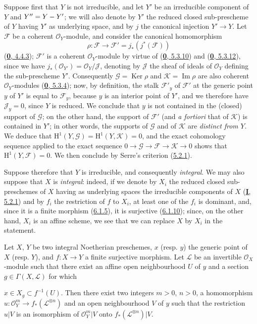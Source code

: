 Suppose first that $Y$ is not irreducible, and let $Y'$ be an irreducible
component of $Y$ and $Y''=Y- Y'$; we will also denote by
$Y'$ the reduced closed sub-prescheme of $Y$ having $Y'$ as underlying
space, and by $j$ the canonical injection $Y'\to Y$. Let $\mathcal{F}$
be a coherent $\mathcal{O}_Y$-module, and consider the canonical homomorphism
\[
\rho:\mathcal{F}\longrightarrow
\mathcal{F}'=j_*(j^*(\mathcal{F}))
\]
(\hyperref[0.4.4.3]{\textbf{0}, 4.4.3}); $\mathcal{F}'$ is a coherent
$\mathcal{O}_Y$-module by virtue of
(\hyperref[0.5.3.10]{\textbf{0}, 5.3.10}) and
(\hyperref[0.5.3.12]{\textbf{0}, 5.3.12}), since we have
$j_*(\mathcal{O}_{Y'})=\mathcal{O}_Y/\mathcal{J}$, denoting by
$\mathcal{J}$ the sheaf of ideals of $\mathcal{O}_Y$ defining the
sub-prescheme $Y'$. Consequently $\mathcal{G}=\operatorname{Ker}\rho$ and
$\mathcal{K}=\operatorname{Im}\rho$ are also coherent $\mathcal{O}_Y$-modules
(\hyperref[0.5.3.4]{\textbf{0}, 5.3.4}); now, by definition, the stalk
$\mathcal{F}'_y$ of $\mathcal{F}'$ at the generic point $y$ of $Y'$ is equal
to $\mathcal{F}_y$, because $y$ is an interior point of $Y'$, and we therefore
have $\mathcal{J}_y=0$, since $Y$ is reduced. We conclude that $y$ is not
contained in the (closed) support of $\mathcal{G}$; on the other hand, the
support of $\mathcal{F}'$ (and \emph{a fortiori} that of $\mathcal{K}$) is
contained in $Y'$; in other words, the supports of $\mathcal{G}$ and of
$\mathcal{K}$ are \emph{distinct from $Y$}. We deduce that
$\mathrm{H}^1(Y,\mathcal{G})=\mathrm{H}^1(Y,\mathcal{K})=0$, and the exact
cohomology sequence applied to the exact sequence
$0\to\mathcal{G}\to\mathcal{F}\to\mathcal{K}\to0$ shows that
$\mathrm{H}^1(Y,\mathcal{F})=0$. We then conclude by Serre's criterion
(\hyperref[II.5.2.1]{5.2.1}).

Suppose therefore that $Y$ is irreducible, and consequently \emph{integral}.
We may also suppose that $X$ is \emph{integral}: indeed, if we denote by $X_i$
the reduced closed sub-preschemes of $X$ having as underlying spaces the
irreducible components of $X$ (\hyperref[I.5.2.1]{\textbf{I}, 5.2.1}) and by
$f_i$ the restriction of $f$ to $X_i$, at least one of the $f_i$ is dominant,
and, since it is a finite morphism (\hyperref[II.6.1.5]{6.1.5}), it is
surjective (\hyperref[II.6.1.10]{6.1.10}); since, on the other hand, $X_i$ is
an affine scheme, we see that we can replace $X$ by $X_i$ in the statement.

\begin{lemma}[6.7.1.1]
\label{II.6.7.1.1}
Let $X$, $Y$ be two integral Noetherian preschemes, $x$ \textup{(resp. $y$)} the
generic point of $X$ \textup{(resp. $Y$)}, and $f:X\to Y$ a finite surjective morphism.
Let $\mathcal{L}$ be an invertible $\mathcal{O}_X$-module such that there
exist an affine open neighbourhood $U$ of $y$ and a section
$g\in\Gamma(X,\mathcal{L})$ for which


$x\in X_g\subset f^{-1}(U)$. Then there exist two integers $m>0$, $n>0$, a
homomorphism
$u:\mathcal{O}_Y^m\to f_*(\mathcal{L}^{\otimes n})$ and an open neighbourhood
$V$ of $y$ such that the restriction $u|V$ is an isomorphism of
$\mathcal{O}_Y^m|V$ onto $f_*(\mathcal{L}^{\otimes n})|V$.
\end{lemma}

